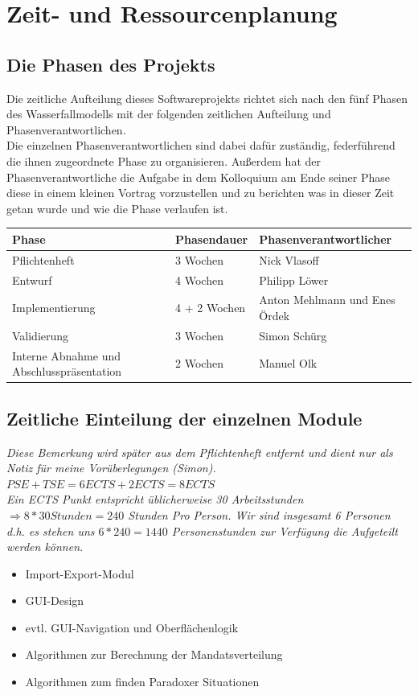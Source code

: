 \documentclass[10pt,a4paper]{article}
\begin{document}
\section{Zeit- und Ressourcenplanung}

\subsection{Die Phasen des Projekts}
Die zeitliche Aufteilung dieses Softwareprojekts richtet sich nach den fünf Phasen des Wasserfallmodells mit der folgenden zeitlichen Aufteilung und Phasenverantwortlichen.\\
Die einzelnen Phasenverantwortlichen sind dabei dafür zuständig, federführend die ihnen zugeordnete Phase zu organisieren. Außerdem hat der Phasenverantwortliche die Aufgabe in dem Kolloquium am Ende seiner Phase diese in einem kleinen Vortrag vorzustellen und zu berichten was in dieser Zeit getan wurde und wie die Phase verlaufen ist.\\

\begin{tabular}[h]{lll}
	\hline
	\textbf{Phase} & \textbf{Phasendauer} & \textbf{Phasenverantwortlicher} \\
	\hline
	Pflichtenheft & 3 Wochen & Nick Vlasoff \\
	Entwurf & 4 Wochen & Philipp Löwer \\
	Implementierung & 4 + 2 Wochen & Anton Mehlmann und Enes Ördek \\
	Validierung & 3 Wochen & Simon Schürg \\
	Interne Abnahme und Abschlusspräsentation & 2 Wochen & Manuel Olk \\
	\hline
\end{tabular}

\subsection{Zeitliche Einteilung der einzelnen Module}
\textit{Diese Bemerkung wird später aus dem Pflichtenheft entfernt und dient nur als Notiz für meine Vorüberlegungen (Simon).\\ $PSE + TSE = 6 ECTS + 2 ECTS = 8 ECTS$\\
Ein ECTS Punkt entspricht üblicherweise 30 Arbeitsstunden $\Rightarrow 8 * 30 Stunden = 240$ Stunden Pro Person. Wir sind insgesamt 6 Personen d.h. es stehen uns $6 * 240 = 1440$ Personenstunden zur Verfügung die Aufgeteilt werden können. }
\begin{itemize}
	\item Import-Export-Modul
	\item GUI-Design
	\item evtl. GUI-Navigation und Oberflächenlogik
	\item Algorithmen zur Berechnung der Mandatsverteilung
	\item Algorithmen zum finden Paradoxer Situationen 
\end{itemize}
\end{document}
